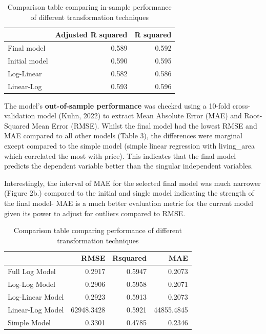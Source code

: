 \documentclass[letterpaper,8pt,twocolumn,twoside,]{pinp}
\begin{document}
\begin{table}[H]

\caption{\label{tab:In-sample performances}Comparison table comparing in-sample performance of different transformation techniques}
\centering
\begin{tabular}[t]{l|r|r}
\hline
  & Adjusted R squared & R squared\\
\hline
Final model & 0.589 & 0.592\\
\hline
Initial model & 0.590 & 0.595\\
\hline
Log-Linear & 0.582 & 0.586\\
\hline
Linear-Log & 0.593 & 0.596\\
\hline
\end{tabular}
\end{table}

The model's \textbf{out-of-sample performance} was checked using a
10-fold cross-validation model (Kuhn, 2022) to extract Mean Absolute
Error (MAE) and Root-Squared Mean Error (RMSE). Whilst the final model
had the lowest RMSE and MAE compared to all other models (Table 3), the
differences were marginal except compared to the simple model (simple
linear regression with living\_area which correlated the most with
price). This indicates that the final model predicts the dependent
variable better than the singular independent variables.

Interestingly, the interval of MAE for the selected final model was much
narrower (Figure 2b.) compared to the initial and single model
indicating the strength of the final model- MAE is a much better
evaluation metric for the current model given its power to adjust for
outliers compared to RMSE.

\begin{table}[H]

\caption{\label{tab:Cross Validation}Comparison table comparing performance of different transformation techniques}
\centering
\begin{tabular}[t]{l|r|r|r}
\hline
  & RMSE & Rsquared & MAE\\
\hline
Full Log Model & 0.2917 & 0.5947 & 0.2073\\
\hline
Log-Log Model & 0.2906 & 0.5958 & 0.2071\\
\hline
Log-Linear Model & 0.2923 & 0.5913 & 0.2073\\
\hline
Linear-Log Model & 62948.3428 & 0.5921 & 44855.4845\\
\hline
Simple Model & 0.3301 & 0.4785 & 0.2346\\
\hline
\end{tabular}
\end{table}
\end{document}
